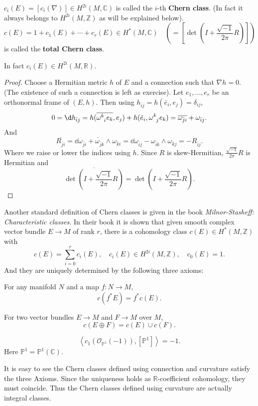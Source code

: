 \documentclass[12pt]{article}
\begin{document}
\begin{definition}
  \(c_i(E)=[c_i(\nabla)]\in H^{2i}(M,\mathbb{C})\) is called the \(i\)-th
  \textbf{Chern class}. (In fact it always belongs to \(H^{2i}(M,\mathbb{Z})\)
  as will be explained below). \[
    c(E)=1+c_1(E)+\cdots +c_r(E)\in H^*(M,\mathbb{C})
    \quad(=[\det(I+\frac{\sqrt{-1}}{2\pi}R)])
  \] is called the \textbf{total Chern class}.
\end{definition}

\begin{lemma}
  In fact \(c_i(E)\in H^{2i}(M,\mathbb{R})\).
\end{lemma}
\begin{proof}
  Choose a Hermitian metric \(h\) of \(E\) and a connection such that
  \(\nabla h=0\). (The existence of such a connection is left as exercise).
  Let \(e_1,\ldots,e_r\) be an orthonormal frame of \((E,h)\). Then using
  \(h_{\bar{i}j}=h(\bar{e}_i,e_j)=\delta_{ij}\), \[
    0=\dd{h_{\bar{i}j}}=h(\overline{\omega\indices{^k_i}e_k},e_j)
    +h(\bar{e}_i,\omega\indices{^k_j}e_k)=\overline{\omega_{\bar{j}i}}
    +\omega_{\bar{i}j}
  .\] And \[
    \overline{R_{\bar{j}i}}=\overline{\dd{\omega_{\bar{j}i}}+\omega_{\bar{j}k}
    \wedge\omega_{\bar{k}i}}=\dd{\omega_{\bar{i}j}}-\omega_{\bar{i}k}\wedge 
    \omega_{\bar{k}j}=-R_{\bar{i}j}
  .\] Where we raise or lower the indices using \(h\). Since \(R\) is
  skew-Hermitian, \(\frac{\sqrt{-1}}{2\pi}R\) is Hermitian and \[
    \overline{\det(I+\frac{\sqrt{-1}}{2\pi}R)}=\det(I+\frac{\sqrt{-1}}{2\pi}R)
  .\] 
\end{proof}

Another standard definition of Chern classes is given in the book
\emph{Milnor-Stasheff: Characteristic classes}. In their book it is shown that
given smooth complex vector bundle \(E\to M\) of rank \(r\), there is a 
cohomology class \(c(E)\in H^*(M,\mathbb{Z})\) with \[
  c(E)=\sum_{i=0}^{r}c_i(E),\quad c_i(E)\in H^{2i}(M,\mathbb{Z}),\quad c_0(E)=1
.\] And they are uniquely determined by the following three axioms:

\begin{axiom}[Naturality]
  For any manifold \(N\) and a map \(f\colon N\to M\), \[
    c(f^*E)=f^*c(E)
  .\] 
\end{axiom}
\begin{axiom}
  For two vector bundles \(E\to M\) and \(F\to M\) over \(M\), \[
    c(E\oplus F)=c(E)\cup c(F)
  .\] 
\end{axiom}
\begin{axiom}[Normalization]
   \[
     \left<c_1(\mathcal{O}_{\mathbb{P}^1}(-1)),[\mathbb{P}^1]\right> =-1
   .\] Here \(\mathbb{P}^1=\mathbb{P}^1(\mathbb{C})\).
\end{axiom}
It is easy to see the Chern classes defined using connection and curvature 
satisfy the three Axioms. Since the uniqueness holds as
\(\mathbb{R}\)-coefficient cohomology, they must coincide. Thus the Chern
classes defined using curvature are actually integral classes.
\end{document}

